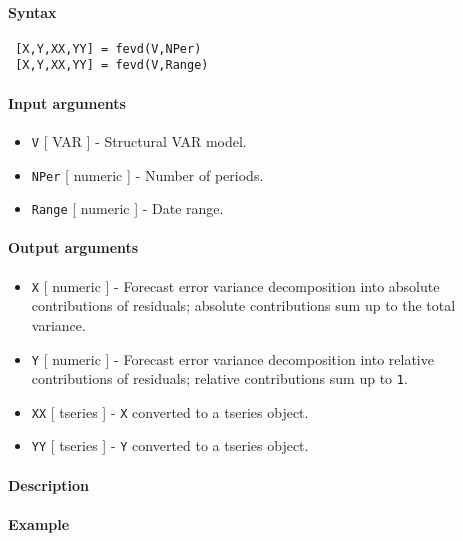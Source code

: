


	\paragraph{Syntax}
 
 \begin{verbatim}
 [X,Y,XX,YY] = fevd(V,NPer)
 [X,Y,XX,YY] = fevd(V,Range)
 \end{verbatim}
 
 \paragraph{Input arguments}
 
 \begin{itemize}
 \item
   \texttt{V} {[} VAR {]} - Structural VAR model.
 \item
   \texttt{NPer} {[} numeric {]} - Number of periods.
 \item
   \texttt{Range} {[} numeric {]} - Date range.
 \end{itemize}
 
 \paragraph{Output arguments}
 
 \begin{itemize}
 \item
   \texttt{X} {[} numeric {]} - Forecast error variance decomposition
   into absolute contributions of residuals; absolute contributions sum
   up to the total variance.
 \item
   \texttt{Y} {[} numeric {]} - Forecast error variance decomposition
   into relative contributions of residuals; relative contributions sum
   up to \texttt{1}.
 \item
   \texttt{XX} {[} tseries {]} - \texttt{X} converted to a tseries
   object.
 \item
   \texttt{YY} {[} tseries {]} - \texttt{Y} converted to a tseries
   object.
 \end{itemize}
 
 \paragraph{Description}
 
 \paragraph{Example}


